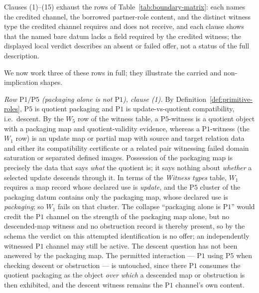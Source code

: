 \documentclass[11pt]{article}
\theoremstyle{definition}
\newcommand{\Pone}{\ensuremath{\mathrm{P1}}}
\newcommand{\Pfive}{\ensuremath{\mathrm{P5}}}
\begin{document}
Clauses (1)--(15) exhaust the rows of Table~\ref{tab:boundary-matrix}: each
names the credited channel, the borrowed partner-role content, and the
distinct witness type the credited channel requires and does not receive, and
each clause shows that the named bare datum lacks a field required by the
credited witness; the displayed local verdict describes an absent or failed
offer, not a status of the full description.

We now work three of these rows in full; they illustrate the carried and
non-implication shapes.

\emph{Row \(\Pone{}/\Pfive{}\) (packaging alone is not \(\Pone{}\)), clause
(1).} By Definition~\ref{def:primitive-roles}, \Pfive{} is quotient packaging
and \Pone{} is update-vs-quotient compatibility, i.e.\ descent. By the
\(W_5\) row of the witness table, a \Pfive{}-witness is a quotient object
with a packaging map and quotient-validity evidence, whereas a
\Pone{}-witness (the \(W_1\) row) is an update map or partial map with source
and target relation data and either its compatibility certificate or a related
pair witnessing failed domain saturation or separated defined images. Possession of the packaging
map is precisely the data that says \emph{what} the quotient is; it says nothing
about \emph{whether} a selected update descends through it. In terms of the
\emph{Witness types} table, \(W_1\) requires a map record whose declared use is
\emph{update}, and the \Pfive{} cluster of the packaging datum contains only
the packaging map, whose declared use is \emph{packaging}; so \(W_1\) fails on
that cluster. The collapse
``packaging alone is \Pone{}'' would credit the \Pone{} channel on the strength
of the packaging map alone, but no descended-map witness and no obstruction
record is thereby present, so by the schema the verdict on this attempted
identification is no offer; an independently witnessed \Pone{} channel may
still be active. The descent question has not been answered by the packaging
map. The
permitted interaction --- \Pone{} using \Pfive{} when checking descent or
obstruction --- is untouched, since there \Pone{} consumes the quotient
packaging as the object \emph{over which} a descended map or obstruction is then
exhibited, and the descent witness remains the \Pone{} channel's own content.
\end{document}

